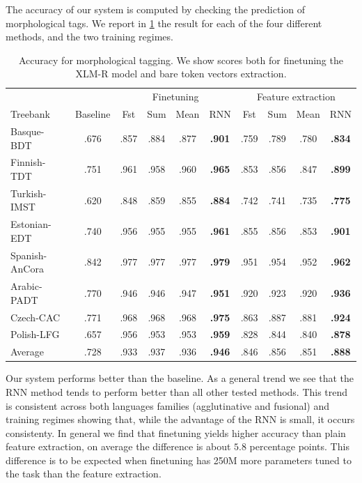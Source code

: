 \documentclass[11pt]{article}
\begin{document}
     The accuracy of our system is computed by checking the prediction
        of morphological tags. We report in \cref{tab:results_tokens}
        the result for each of the four different methods, and the
        two training regimes.

    \begin{table}%
	\centering
	\begin{tabular}{l|c|cccc|cccc}
		& & \multicolumn{4}{c}{Finetuning} & \multicolumn{4}{c}{Feature extraction} \\
		Treebank & Baseline & Fst & Sum & Mean & RNN & Fst & Sum & Mean & RNN \\
		\hline
		Basque-BDT      & .676 & .857 & .884 & .877 & \textbf{.901} & .759 & .789 & .780 & \textbf{.834} \\
		Finnish-TDT     & .751 & .961 & .958 & .960 & \textbf{.965} & .853 & .856 & .847 & \textbf{.899} \\
		Turkish-IMST    & .620 & .848 & .859 & .855 & \textbf{.884} & .742 & .741 & .735 & \textbf{.775} \\
		Estonian-EDT    & .740 & .956 & .955 & .955 & \textbf{.961} & .855 & .856 & .853 & \textbf{.901} \\
		Spanish-AnCora  & .842 & .977 & .977 & .977 & \textbf{.979} & .951 & .954 & .952 & \textbf{.962} \\
		Arabic-PADT     & .770 & .946 & .946 & .947 & \textbf{.951} & .920 & .923 & .920 & \textbf{.936} \\
		Czech-CAC       & .771 & .968 & .968 & .968 & \textbf{.975} & .863 & .887 & .881 & \textbf{.924} \\
		Polish-LFG      & .657 & .956 & .953 & .953 & \textbf{.959} & .828 & .844 & .840 & \textbf{.878} \\
        \hline
        Average         & .728 & .933 & .937 & .936 & \textbf{.946} & .846 & .856 & .851 & \textbf{.888} \\
	\end{tabular}
    	\caption{\label{tab:results_tokens} Accuracy for morphological
          tagging. We show scores both for finetuning the XLM-R model and
          bare token vectors extraction.}
    \end{table}


                Our system performs better than the baseline. As a
     general trend we see that the RNN method tends to perform better
     than all other tested methods. This trend is consistent across
     both languages families (agglutinative and fusional) and
     training regimes showing that, while the advantage of the RNN is
     small, it occurs consistenty.
        In general we find that finetuning yields higher accuracy than
        plain feature extraction, on average the difference is about $5.8$
        percentage points.  This difference is to be expected when
        finetuning has 250M more parameters tuned to the task than the
        feature extraction. %
    
\end{document}
